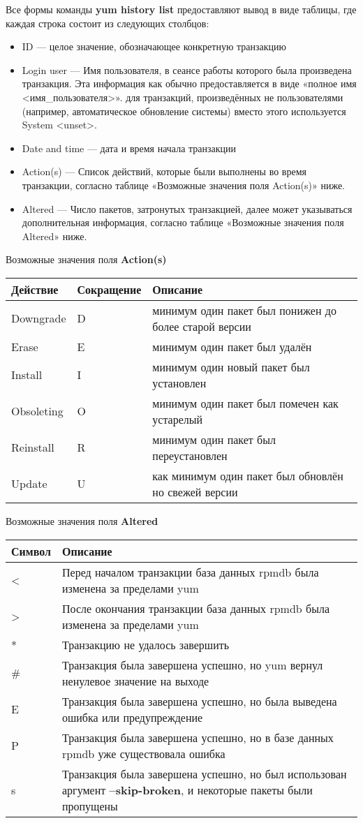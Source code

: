 \documentclass[a4paper,10pt,twoside]{article}
\begin{document}
Все формы команды \textbf{yum history list} предоставляют вывод в виде таблицы, где каждая строка состоит из следующих столбцов:
\begin{itemize}
 \item ID — целое значение, обозначающее конкретную транзакцию
\item Login user — Имя пользователя, в сеансе работы которого была произведена транзакция. Эта информация как обычно предоставляется в виде «полное имя <имя\_пользователя>». для транзакций, произведённых не пользователями (например, автоматическое обновление системы) вместо этого используется System <unset>.
\item Date and time — дата и время начала транзакции
\item Action(s) — Список действий, которые были выполнены во время транзакции, согласно таблице «Возможные значения поля Action(s)» ниже.
\item Altered — Число пакетов, затронутых транзакцией, далее может указываться дополнительная информация, согласно таблице «Возможные значения поля Altered» ниже.
\end{itemize}

Возможные значения поля \textbf{Action(s)}
\begin{longtable}{  m{3cm}  m{3cm}    m{10cm}}  
 Действие & Сокращение & Описание\\\hline
Downgrade & D & минимум один пакет был понижен до более старой версии\\
Erase & E & минимум один пакет был удалён\\
Install & I & минимум один новый пакет был установлен\\
Obsoleting & O & минимум один пакет был помечен как устарелый\\
Reinstall & R & минимум один пакет был переустановлен\\
Update & U & как минимум один пакет был обновлён но свежей версии\\
\end{longtable}


Возможные значения поля \textbf{Altered}
\begin{longtable}{  m{4cm}  m{15cm}  }  
Символ & Описание\\\hline
< & Перед началом транзакции база данных rpmdb была изменена за пределами yum\\
> & После окончания транзакции база данных rpmdb была изменена за пределами yum\\
* & Транзакцию не удалось завершить\\
\# & Транзакция была завершена успешно, но yum вернул ненулевое значение на выходе\\
E & Транзакция была завершена успешно, но была выведена ошибка или предупреждение\\
P & Транзакция была завершена успешно, но в базе данных rpmdb уже существовала ошибка\\
s & Транзакция была завершена успешно, но был использован аргумент \textbf{--skip-broken}, и некоторые пакеты были пропущены\\
\end{longtable}
\end{document}
